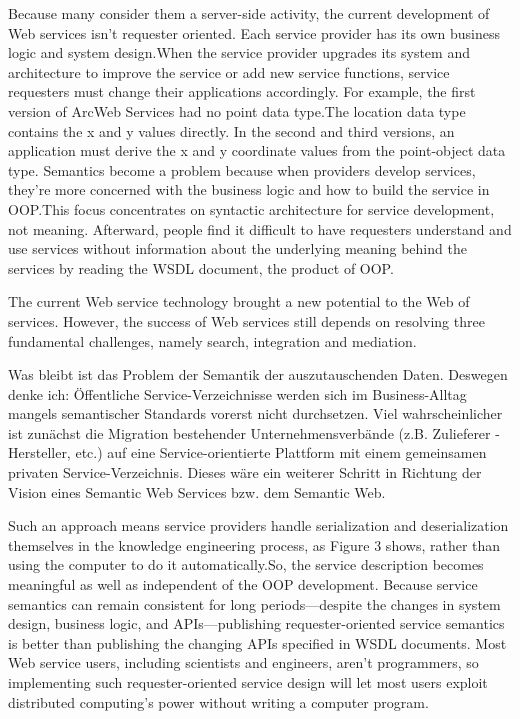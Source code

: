 \documentclass[10pt,a4paper]{article}
\begin{document}
Because many consider them a server-side activity, the
current development of Web services isn’t requester oriented.
Each service provider has its own business logic and
system design.When the service provider upgrades its system
and architecture to improve the service or add new
service functions, service requesters must change their
applications accordingly. For example, the first version of
ArcWeb Services had no point data type.The location data
type contains the x and y values directly. In the second and
third versions, an application must derive the x and y coordinate
values from the point-object data type. Semantics
become a problem because when providers develop services,
they’re more concerned with the business logic and
how to build the service in OOP.This focus concentrates
on syntactic architecture for service development, not
meaning. Afterward, people find it difficult to have
requesters understand and use services without information
about the underlying meaning behind the services by
reading the WSDL document, the product of OOP. \cite{shi1}

The current Web service technology brought a new potential
to the Web of services. However, the success of Web
services still depends on resolving three fundamental challenges,
namely search, integration and mediation. \cite{WSMOLITE}

Was bleibt ist das Problem der Semantik der auszutauschenden Daten. Deswegen denke ich: Öffentliche Service-Verzeichnisse werden sich im Business-Alltag mangels semantischer Standards vorerst nicht durchsetzen. Viel wahrscheinlicher ist zunächst die Migration bestehender Unternehmensverbände (z.B. Zulieferer - Hersteller, etc.) auf eine Service-orientierte Plattform mit einem gemeinsamen privaten Service-Verzeichnis. Dieses wäre ein weiterer Schritt in Richtung der Vision eines Semantic Web Services bzw. dem Semantic Web.  \cite{hhxmlwssoa} 

Such an approach means service providers handle serialization
and deserialization themselves in the knowledge
engineering process, as Figure 3 shows, rather than using
the computer to do it automatically.So, the service description
becomes meaningful as well as independent of the
OOP development.
Because service semantics can remain consistent for long
periods—despite the changes in system design, business
logic, and APIs—publishing requester-oriented service
semantics is better than publishing the changing APIs specified
in WSDL documents. Most Web service users, including
scientists and engineers, aren’t programmers, so
implementing such requester-oriented service design will
let most users exploit distributed computing’s power without
writing a computer program. \cite{shi1}
\end{document}

